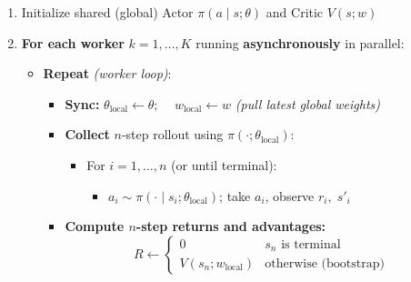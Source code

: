 \documentclass[11pt]{article}
\providecommand{\tightlist}{%
      \setlength{\itemsep}{0pt}\setlength{\parskip}{0pt}}
\begin{document}
\begin{enumerate}
\def\labelenumi{\arabic{enumi}.}
\item
  Initialize shared (global) Actor \(\pi(a \mid s;\theta)\) and Critic
  \(V(s;w)\)
\item
  \textbf{For each worker} \(k = 1, \ldots, K\) running
  \textbf{asynchronously} in parallel:

  \begin{itemize}
  \item
    \textbf{Repeat} \emph{(worker loop)}:

    \begin{itemize}
    \item
      \textbf{Sync:} \(\theta_\text{local} \leftarrow \theta\);
      \(\quad w_\text{local} \leftarrow w\) \emph{(pull latest global
      weights)}
    \item
      \textbf{Collect} \(n\)-step rollout using
      \(\pi(\cdot;\theta_\text{local})\):

      \begin{itemize}
      \tightlist
      \item
        For \(i = 1, \ldots, n\) (or until terminal):

        \begin{itemize}
        \tightlist
        \item
          \(a_i \sim \pi(\cdot \mid s_i;\theta_\text{local})\); take
          \(a_i\), observe \(r_i,\; s'_i\)
        \end{itemize}
      \end{itemize}
    \item
      \textbf{Compute \(n\)-step returns and advantages:}
      \[R \leftarrow \begin{cases} 0 & s_n \text{ is terminal} \\ V(s_n;w_\text{local}) & \text{otherwise (bootstrap)} \end{cases}\]


\end{itemize}
\end{itemize}
\end{enumerate}
\end{document}
